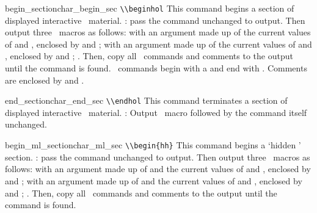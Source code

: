 \begin{describecmd}{begin_section}{char_begin_sec}{\none}
{\verb|\\beginhol|}
\describe
This command begins a section of displayed interactive \HOL\ material.
\winnowaction: pass the command unchanged to output.  Then output
three \mweb\ macros as follows: 
  with an argument made up of the 
current values of  and , enclosed
by  and ;
  with an argument made up of the 
current values of  and , enclosed
by  and ;
 .  Then, copy all \HOL\ commands
and comments to the output until the command  is
found.  \HOL\ commands begin with a  and end
with .  Comments are enclosed by
 and .
\end{describecmd}

\begin{describecmd}{end_section}{char_end_sec}{\none}
{\verb|\\endhol|}
\describe
This command terminates a section of displayed interactive \HOL\ material.
\winnowaction: Output \mweb\ macro
  followed by the command itself unchanged.
\end{describecmd}

\begin{describecmd}{begin_ml_section}{char_ml_sec}{\none}
{\verb|\\begin{hh}|}
\describe
This command begins a `hidden \HOL' section. 
\winnowaction: pass the command unchanged to output.  Then output
three \mweb\ macros as follows: 
  with an argument made up of
 and the 
current values of  and , enclosed
by  and ;
  with an argument made up of
 and the current values of  and
, enclosed by  and ;
 .  
Then, copy all \HOL\ commands and comments to the output until the
command  is found. 
\end{describecmd}

